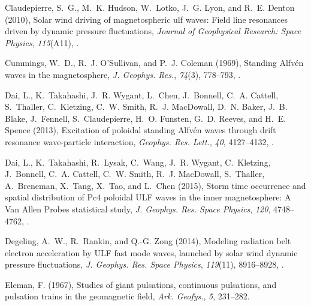 \documentclass[draft,linenumbers]{agujournal}
\begin{document}
\begin{thebibliography}{62}
Claudepierre, S.~G., M.~K. Hudson, W.~Lotko, J.~G. Lyon, and R.~E. Denton
  (2010), Solar wind driving of magnetospheric ulf waves: Field line resonances
  driven by dynamic pressure fluctuations, \textit{Journal of Geophysical
  Research: Space Physics}, \textit{115}(A11), .

Cummings, W.~D., R.~J. O'Sullivan, and P.~J. Coleman (1969), Standing
  {Alfv{\'e}n} waves in the magnetosphere, \textit{J. Geophys. Res.},
  \textit{74}(3), 778--793, .

Dai, L., K.~Takahashi, J.~R. Wygant, L.~Chen, J.~Bonnell, C.~A. Cattell,
  S.~Thaller, C.~Kletzing, C.~W. Smith, R.~J. MacDowall, D.~N. Baker, J.~B.
  Blake, J.~Fennell, S.~Claudepierre, H.~O. Funsten, G.~D. Reeves, and H.~E.
  Spence (2013), Excitation of poloidal standing {Alfv{\'e}n} waves through
  drift resonance wave-particle interaction, \textit{Geophys. Res. Lett.},
  \textit{40}, 4127--4132, .

Dai, L., K.~Takahashi, R.~Lysak, C.~Wang, J.~R. Wygant, C.~Kletzing,
  J.~Bonnell, C.~A. Cattell, C.~W. Smith, R.~J. MacDowall, S.~Thaller,
  A.~Breneman, X.~Tang, X.~Tao, and L.~Chen (2015), Storm time occurrence and
  spatial distribution of {Pc4} poloidal {ULF} waves in the inner
  magnetosphere: A {Van Allen Probes} statistical study, \textit{J. Geophys.
  Res. Space Physics}, \textit{120}, 4748--4762, .

Degeling, A.~W., R.~Rankin, and Q.-G. Zong (2014), Modeling radiation belt
  electron acceleration by {ULF} fast mode waves, launched by solar wind
  dynamic pressure fluctuations, \textit{J. Geophys. Res. Space Physics},
  \textit{119}(11), 8916--8928, .

Eleman, F. (1967), Studies of giant pulsations, continuous pulsations, and
  pulsation trains in the geomagnetic field, \textit{Ark. Geofys.}, \textit{5},
  231--282.


\end{thebibliography}
\end{document}
